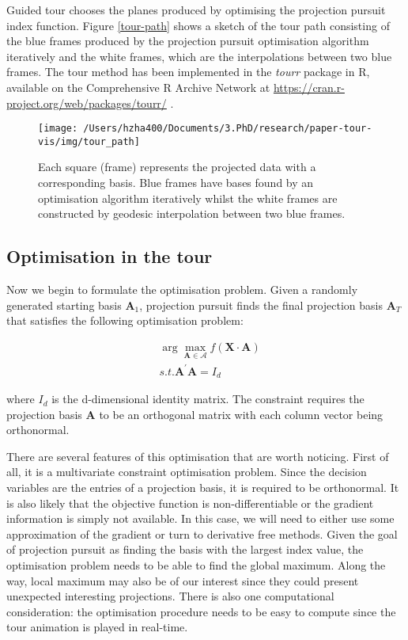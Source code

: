 \documentclass[12pt]{article}
\begin{document}
Guided tour chooses the planes produced by optimising the projection pursuit index function. Figure \ref{tour-path} shows a sketch of the tour path consisting of the blue frames produced by the projection pursuit optimisation algorithm iteratively and the white frames, which are the interpolations between two blue frames. The tour method has been implemented in the \emph{tourr} package in R, available on the Comprehensive R Archive Network at \url{https://cran.r-project.org/web/packages/tourr/} \citep{wickham2011tourrpackage}.

\begin{figure}

{\centering \texttt{[image: /Users/hzha400/Documents/3.PhD/research/paper-tour-vis/img/tour\_path]} 

}

\caption{Each square (frame) represents the projected data with a corresponding basis. Blue frames have bases found by an optimisation algorithm iteratively whilst the white frames are constructed by geodesic interpolation between two blue frames.}\label{fig:tour-path}
\end{figure}



\hypertarget{tour-optim}{%
\subsection{Optimisation in the tour}\label{tour-optim}}

Now we begin to formulate the optimisation problem. Given a randomly generated starting basis \(\mathbf{A}_1\), projection pursuit finds the final projection basis \(\mathbf{A}_T\) that satisfies the following optimisation problem:

\begin{align}
&\arg \max_{\mathbf{A} \in \mathcal{A}} f(\mathbf{X} \cdot \mathbf{A}) \\
&s.t.  \mathbf{A}^{\prime} \mathbf{A} = I_d
\end{align}

where \(I_d\) is the d-dimensional identity matrix. The constraint requires the projection basis \(\mathbf{A}\) to be an orthogonal matrix with each column vector being orthonormal.

There are several features of this optimisation that are worth noticing. First of all, it is a multivariate constraint optimisation problem. Since the decision variables are the entries of a projection basis, it is required to be orthonormal. It is also likely that the objective function is non-differentiable or the gradient information is simply not available. In this case, we will need to either use some approximation of the gradient or turn to derivative free methods. Given the goal of projection pursuit as finding the basis with the largest index value, the optimisation problem needs to be able to find the global maximum. Along the way, local maximum may also be of our interest since they could present unexpected interesting projections. There is also one computational consideration: the optimisation procedure needs to be easy to compute since the tour animation is played in real-time.
\end{document}
